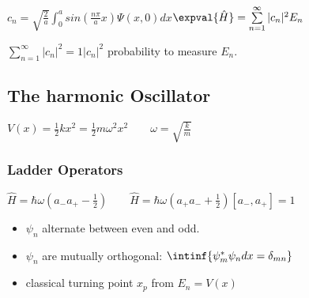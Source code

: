 \documentclass[10pt,a4paper]{scrartcl}
\begin{document}
\begin{multicols*}{3}
	
	
	$c_n=\sqrt{\frac{2}{a}}\int_0^a{sin(\frac{n\pi}{a}x)\Psi(x,0)dx}$\hfill$\expval{\hat{H}}=\sum\limits_{n=1}^\infty{|c_n|^2}E_n$
	
	\finn
	
	$\sum_{n=1}^\infty{|c_n|^2}=1$\hfill $|c_n|^2$ probability to measure $E_n$.
	
	\subsection{The harmonic Oscillator}
	
	$V(x)=\frac{1}{2}kx^2=\frac{1}{2}m\omega^2x^2\qquad\omega=\sqrt{\frac{k}{m}}$
	
	\subsubsection{Ladder Operators}
	\begin{center}
	\end{center}
	
	$\hat{H}=\hbar\omega(a_-a_+-\frac{1}{2})\qquad \hat{H}=\hbar\omega(a_+a_-+\frac{1}{2})$\hfill$[a_-,a_+]=1$
	
	\begin{center}
	
	
	
	\end{center}
	
	\begin{itemize}
	\compaq
	\item
	$\psi_n$ alternate between even and odd.
	\item
	$\psi_n$ are mutually orthogonal: $\intinf{\psi_m^*\psi_ndx=\delta_{mn}}$	
	\item
	classical turning point $x_p$ from $E_n=V(x)$
	\end{itemize}
	

\end{multicols*}
\end{document}
